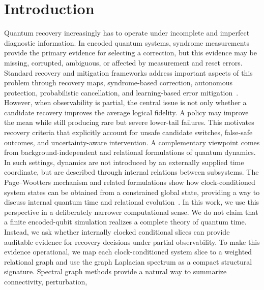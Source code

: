 \documentclass{iopjournal}
\begin{document}
\section{Introduction}\label{sec:introduction}

Quantum recovery increasingly has to operate under incomplete and imperfect 
diagnostic information. In encoded quantum systems, syndrome measurements 
provide the primary evidence for selecting a correction, but this evidence 
may be missing, corrupted, ambiguous, or affected by measurement and reset errors. 
Standard recovery and mitigation frameworks address important aspects of this 
problem through recovery maps, syndrome-based correction, autonomous protection, 
probabilistic cancellation, and learning-based error mitigation~\cite{Lautenbacher2024PetzRecoveryQudit,Gertler2021AutonomousQECBosonic,VanDenBerg2023SparsePauliLindbladPEC,Strikis2021LearningBasedQEM,Liao2024MachineLearningQEM}. 
However, when observability is partial, the central issue is not only whether 
a candidate recovery improves the average logical fidelity. A policy may improve 
the mean while still producing rare but severe lower-tail failures. 
This motivates recovery criteria that explicitly account for unsafe candidate 
switches, false-safe outcomes, and uncertainty-aware intervention.
A complementary viewpoint comes from background-independent and relational formulations 
of quantum dynamics. In such settings, dynamics are not introduced by an 
externally supplied time coordinate, but are described through internal relations 
between subsystems. The Page--Wootters mechanism and related formulations show how 
clock-conditioned system states can be obtained from a constrained global state, 
providing a way to discuss internal quantum time and relational evolution~\cite{Smolin2005BackgroundIndependence,Rovelli2007QuantumGravity,Giovannetti2015QuantumTime,Marletto2017EvolutionWithoutEvolution,Hoehn2021TrinityRelationalQuantumDynamics,Rijavec2023RobustnessPageWootters}. 
In this work, we use this perspective in a deliberately narrower computational sense. 
We do not claim that a finite encoded-qubit simulation realizes a complete theory of 
quantum time. Instead, we ask whether internally clocked conditional slices can provide 
auditable evidence for recovery decisions under partial observability.
To make this evidence operational, we map each clock-conditioned system slice to a weighted 
relational graph and use the graph Laplacian spectrum as a compact structural signature. 
Spectral graph methods provide a natural way to summarize connectivity, perturbation, 
\end{document}
